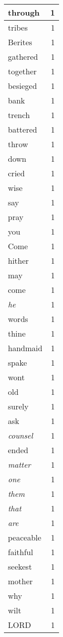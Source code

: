 \begin{center}
\begin{longtable}{l|r}
through & 1 \\ \hline
tribes & 1 \\ \hline
Berites & 1 \\ \hline
gathered & 1 \\ \hline
together & 1 \\ \hline
besieged & 1 \\ \hline
bank & 1 \\ \hline
trench & 1 \\ \hline
battered & 1 \\ \hline
throw & 1 \\ \hline
down & 1 \\ \hline
cried & 1 \\ \hline
wise & 1 \\ \hline
say & 1 \\ \hline
pray & 1 \\ \hline
you & 1 \\ \hline
Come & 1 \\ \hline
hither & 1 \\ \hline
may & 1 \\ \hline
come & 1 \\ \hline
\emph{he} & 1 \\ \hline
words & 1 \\ \hline
thine & 1 \\ \hline
handmaid & 1 \\ \hline
spake & 1 \\ \hline
wont & 1 \\ \hline
old & 1 \\ \hline
surely & 1 \\ \hline
ask & 1 \\ \hline
\emph{counsel} & 1 \\ \hline
ended & 1 \\ \hline
\emph{matter} & 1 \\ \hline
\emph{one} & 1 \\ \hline
\emph{them} & 1 \\ \hline
\emph{that} & 1 \\ \hline
\emph{are} & 1 \\ \hline
peaceable & 1 \\ \hline
faithful & 1 \\ \hline
seekest & 1 \\ \hline
mother & 1 \\ \hline
why & 1 \\ \hline
wilt & 1 \\ \hline
LORD & 1 \\ \hline

\end{longtable}
\end{center}
